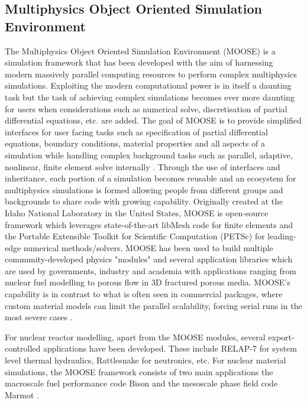 \subsection{Multiphysics Object Oriented Simulation Environment}
	The Multiphysics Object Oriented Simulation Environment (MOOSE) is a simulation framework that has been developed with the aim of harnessing modern massively parallel computing resources to perform complex multiphysics simulations. Exploiting the modern computational power is in itself a daunting task but the task of achieving complex simulations becomes ever more daunting for users when considerations such as numerical solve, discretisation of partial differential equations, etc. are added. The goal of MOOSE is to provide simplified interfaces for user facing tasks such as specification of partial differential equations, boundary conditions, material properties and all aspects of a simulation while handling complex background tasks such as   parallel, adaptive, nonlinear, finite element solve internally \cite{Permann:2020aa}. Through the use of interfaces and inheritance, each portion of a simulation becomes reusable and an ecosystem for multiphysics simulations is formed allowing people from different groups and backgrounds to share code with growing capability. Originally created at the Idaho National Laboratory in the United States, MOOSE is open-source framework which leverages state-of-the-art libMesh code \cite{Kirk:2006aa} for finite elements and the Portable Extensible Toolkit for Scientific Computation (PETSc) \cite{Balay:2022ab,Balay:2022aa} for leading-edge numerical methods/solvers. MOOSE has been used to build multiple community-developed physics "modules" \cite{Guillaume:2021aa,Guillaume:2021ab,Adhikary:2016aa,Wilkins:2020aa,Shemon:2021aa} and several application libraries which are used by governments, industry and academia with applications ranging from nuclear fuel modelling to porous flow in 3D fractured porous media. MOOSE's capability is in contrast to what is often seen in commercial packages, where custom material models can limit the parallel scalability, forcing serial runs in the most severe cases \cite{gaston2015physics}. 
	
	For nuclear reactor modelling, apart from the MOOSE modules, several export-controlled applications have been developed. These include {RELAP-7} \cite{Zhang:aa} for system level thermal hydraulics, {Rattlesnake} \cite{Wang:aa} for neutronics, etc. For nuclear material simulations, the {MOOSE} framework consists of two main applications the macroscale fuel performance code {Bison} \cite{WILLIAMSON2012149} and the mesoscale phase field code {Marmot}  \cite{Tonks12}. 
	

